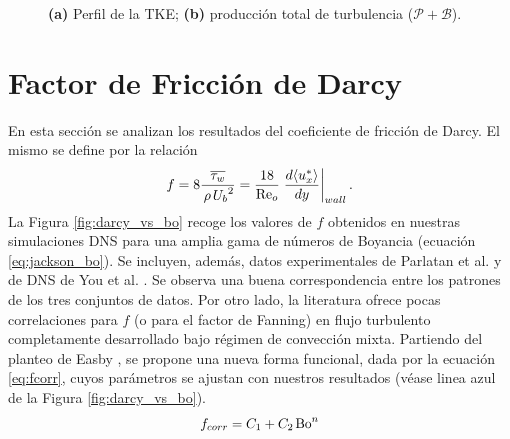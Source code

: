 \begin{figure}[H]
  \centering
  \caption{\textbf{(a)} Perfil de la TKE; \textbf{(b)} producción total de turbulencia ($\mathcal{P} + \mathcal{B}$).}
  \label{fig:budgets_prod}
\end{figure}


\newpage
\section{Factor de Fricción de Darcy}

En esta sección se analizan los resultados del coeficiente de fricción de Darcy. El mismo se define por la relación
\begin{equation}
f = 8 \frac{ \overline{\tau_w}}{\hspace{0.5mm} \rho \hspace{0.5mm} {U_b}^2 }  = \frac{18}{\text{Re}_o} \left.\frac{d \langle u^*_x \rangle}{dy}\right\vert_{wall} \text{.}
\label{eq:darcy}
\end{equation}
La Figura \ref{fig:darcy_vs_bo} recoge los valores de $f$ obtenidos en nuestras simulaciones DNS para una amplia gama de números de Boyancia (ecuación \ref{eq:jackson_bo}). Se incluyen, además, datos experimentales de Parlatan et al. \cite{parlatan1996buoyancy} y de DNS de You et al. \cite{you2003direct}. Se observa una buena correspondencia entre los patrones de los tres conjuntos de datos. Por otro lado, la literatura ofrece pocas correlaciones para $f$ (o para el factor de Fanning) en flujo turbulento completamente desarrollado bajo régimen de convección mixta. Partiendo del planteo de Easby \cite{easby1978effect}, se propone una nueva forma funcional, dada por la ecuación \ref{eq:fcorr}, cuyos parámetros se ajustan con nuestros resultados (véase linea azul de la Figura \ref{fig:darcy_vs_bo}).
\begin{equation}
f_{corr} = C_1 + C_2 \hspace*{0.5mm} \text{Bo}^n
\label{eq:fcorr}
\end{equation}

